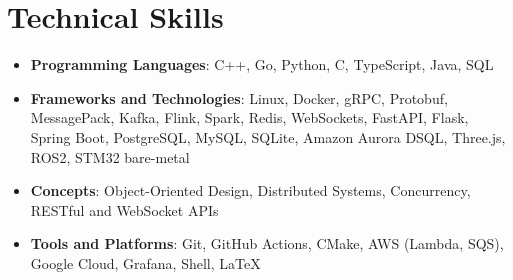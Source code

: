 \documentclass[letterpaper,11pt]{article}
\newcommand{\resumeItem}[2]{
  \item\small{
    \vspace{2pt}\textbf{#1}{: #2 \vspace{-2pt}}
  }
}
\newcommand{\resumeSubItem}[2]{\resumeItem{#1}{#2}\vspace{-2pt}}
\newcommand{\resumeSubHeadingListStart}{\begin{itemize}[leftmargin=0in, labelsep=0in, label={}, itemsep=3pt]}
\newcommand{\resumeSubHeadingListEnd}{\end{itemize}}
\begin{document}
\section{Technical Skills}
\resumeSubHeadingListStart
\resumeSubItem{Programming Languages}
{C++, Go, Python, C, TypeScript, Java, SQL}
\resumeSubItem{Frameworks and Technologies}
{Linux, Docker, gRPC, Protobuf, MessagePack, Kafka, Flink, Spark, Redis, WebSockets, FastAPI, Flask, Spring Boot, PostgreSQL, MySQL, SQLite, Amazon Aurora DSQL, Three.js, ROS2, STM32 bare-metal}
\resumeSubItem{Concepts}
{Object-Oriented Design, Distributed Systems, Concurrency, RESTful and WebSocket APIs}
\resumeSubItem{Tools and Platforms}
{Git, GitHub Actions, CMake, AWS (Lambda, SQS), Google Cloud, Grafana, Shell, \LaTeX}
\resumeSubHeadingListEnd
\end{document}
